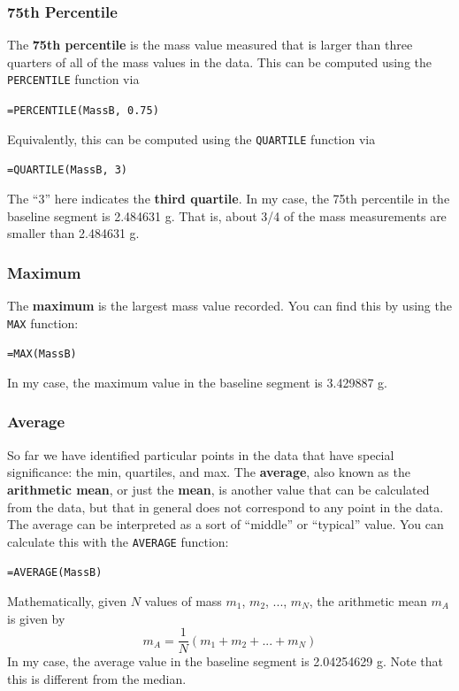 \subsubsection{75th Percentile}
The \textbf{75th percentile} is the mass value measured that is larger than three quarters of all of the mass values in the data. This can be computed using the \texttt{PERCENTILE} function via
\begin{center}
    \texttt{=PERCENTILE(MassB, 0.75)}
\end{center}
Equivalently, this can be computed using the \texttt{QUARTILE} function via
\begin{center}
    \texttt{=QUARTILE(MassB, 3)}
\end{center}
The ``3'' here indicates the \textbf{third quartile}. In my case, the 75th percentile in the baseline segment is 2.484631 g. That is, about 3/4 of the mass measurements are smaller than 2.484631 g.
\subsubsection{Maximum}
The \textbf{maximum} is the largest mass value recorded. You can find this by using the \texttt{MAX} function:
\begin{center}
    \texttt{=MAX(MassB)}
\end{center}
In my case, the maximum value in the baseline segment is 3.429887 g.
\subsubsection{Average}
So far we have identified particular points in the data that have special significance: the min, quartiles, and max. The \textbf{average}, also known as the \textbf{arithmetic mean}, or just the \textbf{mean}, is another value that can be calculated from the data, but that in general does not correspond to any point in the data. The average can be interpreted as a sort of ``middle'' or ``typical'' value. You can calculate this with the \texttt{AVERAGE} function:
\begin{center}
    \texttt{=AVERAGE(MassB)}
\end{center}
Mathematically, given $N$ values of mass $m_{1}$, $m_{2}$, ..., $m_{N}$, the arithmetic mean $m_{A}$ is given by
\begin{equation}
    m_{A} = \frac{1}{N} \left( m_{1} + m_{2} + ... + m_{N} \right)
\end{equation}
In my case, the average value in the baseline segment is 2.04254629 g. Note that this is different from the median.
